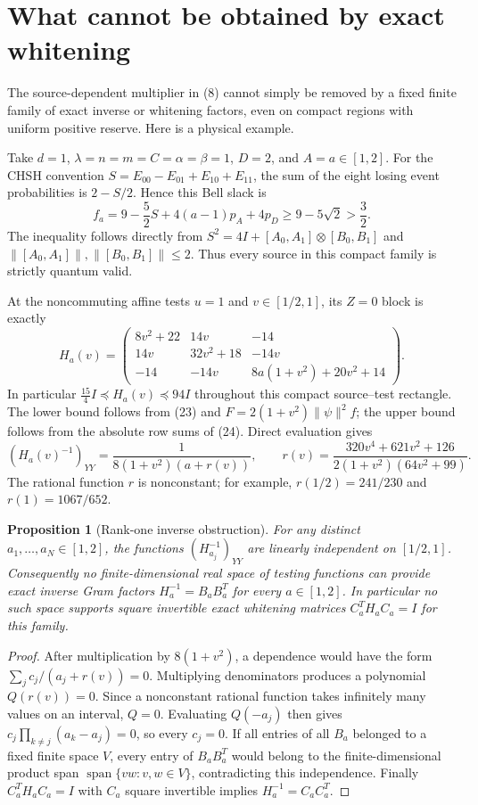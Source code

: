 \documentclass[11pt]{article}
\newtheorem{proposition}{Proposition}
\begin{document}
\section{What cannot be obtained by exact whitening}

The source-dependent multiplier in (8) cannot simply be removed by a
fixed finite family of exact inverse or whitening factors, even on
compact regions with uniform positive reserve.  Here is a physical
example.

Take $d=1$, $\lambda=n=m=C=\alpha=\beta=1$, $D=2$, and $A=a\in[1,2]$.
For the CHSH convention $S=E_{00}-E_{01}+E_{10}+E_{11}$, the sum of the
eight losing event probabilities is $2-S/2$.  Hence this Bell slack is
\[
 f_a=9-\frac52S+4(a-1)p_A+4p_D
                    \geq9-5\sqrt2>\frac32.             \tag{23}
\]
The inequality follows directly from $S^2=4I+[A_0,A_1]\otimes[B_0,B_1]$
and $\|[A_0,A_1]\|,\|[B_0,B_1]\|\leq2$.
Thus every source in this compact family is strictly quantum valid.

At the noncommuting affine tests $u=1$ and $v\in[1/2,1]$, its $Z=0$
block is exactly
\[
 H_a(v)=\begin{pmatrix}
 8v^2+22&14v&-14\\
 14v&32v^2+18&-14v\\
 -14&-14v&8a(1+v^2)+20v^2+14
 \end{pmatrix}.                                           \tag{24}
\]
In particular $\frac{15}{4}I\preceq H_a(v)\preceq94I$ throughout this
compact source--test rectangle.  The lower bound follows from (23) and
$F=2(1+v^2)\|\psi\|^2f$; the upper bound follows from the absolute row
sums of (24).  Direct evaluation gives
\[
 (H_a(v)^{-1})_{YY}=
 \frac{1}{8(1+v^2)(a+r(v))},\qquad
 r(v)=\frac{320v^4+621v^2+126}{2(1+v^2)(64v^2+99)}.       \tag{25}
\]
The rational function $r$ is nonconstant; for example,
$r(1/2)=241/230$ and $r(1)=1067/652$.

\begin{proposition}[Rank-one inverse obstruction]
For any distinct $a_1,\ldots,a_N\in[1,2]$, the functions
$(H_{a_j}^{-1})_{YY}$ are linearly independent on $[1/2,1]$.
Consequently no finite-dimensional real space of testing functions
can provide exact inverse Gram factors $H_a^{-1}=B_aB_a^T$ for every
$a\in[1,2]$.  In particular no such space supports square invertible
exact whitening matrices $C_a^TH_aC_a=I$ for this family.
\end{proposition}

\begin{proof}
After multiplication by $8(1+v^2)$, a dependence would have the form
$\sum_jc_j/(a_j+r(v))=0$.  Multiplying denominators produces a
polynomial $Q(r(v))=0$.  Since a nonconstant rational function takes
infinitely many values on an interval, $Q=0$.  Evaluating $Q(-a_j)$
then gives $c_j\prod_{k\ne j}(a_k-a_j)=0$, so every $c_j=0$.
If all entries of all $B_a$ belonged to a fixed finite space $V$, every
entry of $B_aB_a^T$ would belong to the finite-dimensional product span
$\operatorname{span}\{vw:v,w\in V\}$, contradicting this independence.
Finally $C_a^TH_aC_a=I$ with $C_a$ square invertible implies
$H_a^{-1}=C_aC_a^T$.
\end{proof}
\end{document}
